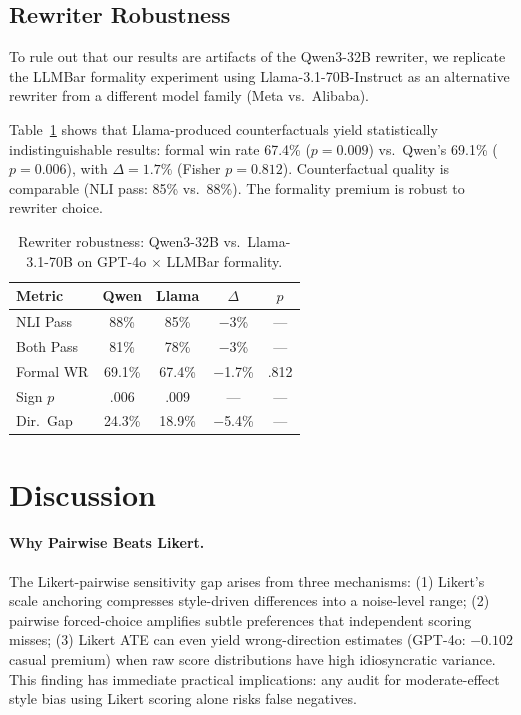 \documentclass[11pt,a4paper]{article}
\begin{document}
\subsection{Rewriter Robustness}
\label{sec:rewriter}

To rule out that our results are artifacts of the Qwen3-32B rewriter, we replicate the LLMBar formality experiment using Llama-3.1-70B-Instruct as an alternative rewriter from a different model family (Meta vs.\ Alibaba).

Table~\ref{tab:rewriter} shows that Llama-produced counterfactuals yield statistically indistinguishable results: formal win rate 67.4\% ($p{=}0.009$) vs.\ Qwen's 69.1\% ($p{=}0.006$), with $\Delta{=}1.7\%$ (Fisher $p{=}0.812$).
Counterfactual quality is comparable (NLI pass: 85\% vs.\ 88\%).
The formality premium is robust to rewriter choice.

\begin{table}[t]
\centering
\small
\begin{tabular}{lcccc}
\toprule
\textbf{Metric} & \textbf{Qwen} & \textbf{Llama} & $\Delta$ & \textbf{$p$} \\
\midrule
NLI Pass & 88\% & 85\% & $-$3\% & --- \\
Both Pass & 81\% & 78\% & $-$3\% & --- \\
Formal WR & 69.1\% & 67.4\% & $-$1.7\% & .812 \\
Sign $p$ & .006 & .009 & --- & --- \\
Dir.\ Gap & 24.3\% & 18.9\% & $-$5.4\% & --- \\
\bottomrule
\end{tabular}
\caption{Rewriter robustness: Qwen3-32B vs.\ Llama-3.1-70B on GPT-4o $\times$ LLMBar formality.}
\label{tab:rewriter}
\end{table}

\section{Discussion}
\label{sec:discussion}

\paragraph{Why Pairwise Beats Likert.}
The Likert-pairwise sensitivity gap arises from three mechanisms: (1) Likert's scale anchoring compresses style-driven differences into a noise-level range; (2) pairwise forced-choice amplifies subtle preferences that independent scoring misses; (3) Likert ATE can even yield wrong-direction estimates (GPT-4o: $-0.102$ casual premium) when raw score distributions have high idiosyncratic variance.
This finding has immediate practical implications: any audit for moderate-effect style bias using Likert scoring alone risks false negatives.
\end{document}
